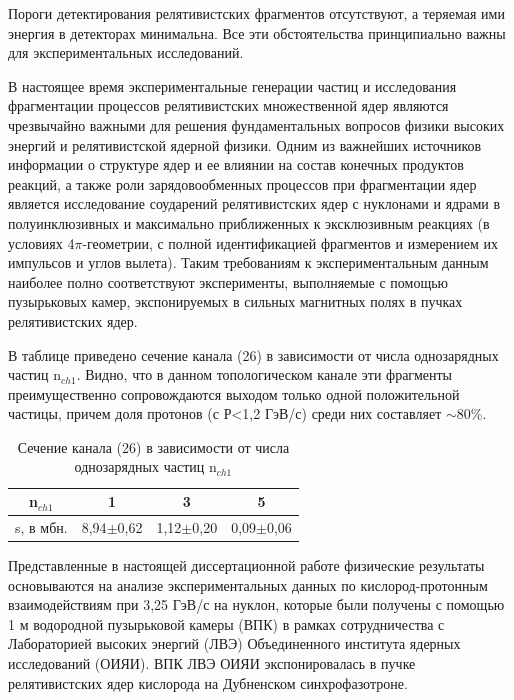 \documentclass[fontsize=14pt]{scrreport}
\begin{document}
Пороги детектирования релятивистских фрагментов отсутствуют, а теряемая ими энергия в детекторах минимальна. Все эти обстоятельства принципиально важны для экспериментальных исследований.

В настоящее время экспериментальные генерации частиц и исследования фрагментации процессов релятивистских множественной ядер являются чрезвычайно важными для решения фундаментальных вопросов физики высоких энергий и релятивистской ядерной физики. Одним из важнейших источников информации о структуре ядер и ее влиянии на состав конечных продуктов реакций, а также роли зарядовообменных процессов при фрагментации ядер является исследование соударений релятивистских ядер с нуклонами и ядрами в полуинклюзивных и максимально приближенных к эксклюзивным реакциях (в условиях 4$\pi$-геометрии, с полной идентификацией фрагментов и измерением их импульсов и углов вылета). Таким требованиям к экспериментальным данным наиболее полно соответствуют эксперименты, выполняемые с помощью пузырьковых камер, экспонируемых в сильных магнитных полях в пучках релятивистских ядер.

В таблице приведено сечение канала (26) в зависимости от числа однозарядных частиц n$_{ch1}$. Видно, что в данном топологическом канале эти фрагменты преимущественно сопровождаются выходом только одной положительной частицы, причем доля протонов (с Р<1,2 ГэВ/с) среди них составляет $\sim$80\%. 


\begin{table}
\centering
    \begin{tabular}{|c|c|c|c|}
    \hline
        n$_{ch1}$&	1&	3&	5\\
        \hline
s, в мбн.&	8,94$\pm$0,62&	1,12$\pm$0,20&	0,09$\pm$0,06\\
\hline
    \end{tabular}
    \caption{Сечение канала (26) в зависимости от числа однозарядных частиц n$_{ch1}$}
    \label{tab:my_label}
\end{table}

\hspace{0.6cm}Представленные в настоящей диссертационной работе физические результаты основываются на анализе экспериментальных данных по кислород-протонным взаимодействиям при 3,25 ГэВ/с на нуклон, которые были получены с помощью 1 м водородной пузырьковой камеры (ВПК) в
рамках сотрудничества с Лабораторией высоких энергий (ЛВЭ)
Объединенного института ядерных исследований (ОИЯИ). ВПК ЛВЭ ОИЯИ
экспонировалась в пучке релятивистских ядер кислорода на Дубненском
синхрофазотроне.
\end{document}
